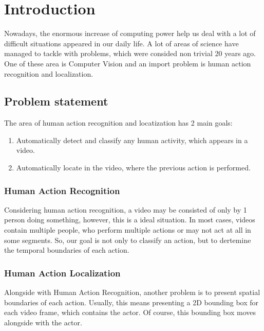 



% 

\chapter{Introduction}
Nowadays, the enormous increase of computing power help us deal with a lot of difficult situations appeared in our daily life.
A lot of areas of science have managed to tackle with problems, which were consided non trivial 20 years ago. One of
these area is Computer Vision and an import problem is human action recognition and localization.
\section{Problem statement}
The area of human action recognition and locatization has 2 main goals:
\begin{enumerate}
\item Automatically detect and classify any human activity, which appears in a video.
\item Automatically locate in the video, where the previous action is performed.
\end{enumerate}

\subsection{Human Action Recognition}
Considering human action recognition, a video may be consisted of only by 1 person doing something, however, this is a ideal
situation. In most cases, videos contain multiple people, who perform multiple actions or may not act at all in some segments.
So, our goal is not only to classify an action, but to dertemine the temporal boundaries of each action.
\subsection{Human Action Localization}
Alongside with Human Action Recognition, another problem is to present spatial boundaries of each action. Usually, this means
presenting a 2D bounding box for each video frame, which contains the actor. Of course, this bounding box moves alongside with
the actor.

